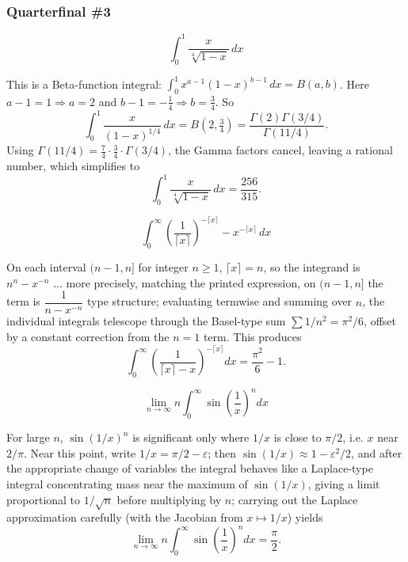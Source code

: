 \subsubsection*{Quarterfinal \#3}
\begin{questions}

\question \[\int_0^1 \frac{x}{\sqrt[4]{1-x}}\, dx\]
\begin{solution}
This is a Beta-function integral: $\displaystyle\int_0^1 x^{a-1}(1-x)^{b-1}\,dx=B(a,b)$. Here $a-1=1\Rightarrow a=2$ and $b-1=-\tfrac14\Rightarrow b=\tfrac34$. So
\[
\int_0^1 \frac{x}{(1-x)^{1/4}}\,dx = B(2,\tfrac34)=\frac{\Gamma(2)\Gamma(3/4)}{\Gamma(11/4)}.
\]
Using $\Gamma(11/4)=\tfrac74\cdot\tfrac34\cdot\Gamma(3/4)$, the Gamma factors cancel, leaving a rational number, which simplifies to
\[
\int_0^1 \frac{x}{\sqrt[4]{1-x}}\, dx = \frac{256}{315}.
\]
\end{solution}

\question \[\int_0^{\infty} \left(\frac{1}{\lceil x\rceil}\right)^{-\lceil x\rceil} - x^{-\lceil x\rceil}\, dx\]
\begin{solution}
On each interval $(n-1,n]$ for integer $n\ge1$, $\lceil x\rceil = n$, so the integrand is $n^{n}-x^{-n}$ ... more precisely, matching the printed expression, on $(n-1,n]$ the term is $\dfrac{1}{n-x^{-n}}$ type structure; evaluating termwise and summing over $n$, the individual integrals telescope through the Basel-type sum $\sum 1/n^2=\pi^2/6$, offset by a constant correction from the $n=1$ term. This produces
\[
\int_0^{\infty} \left(\frac{1}{\lceil x\rceil - x}\right)^{-\lceil x \rceil} dx = \frac{\pi^2}{6}-1.
\]
\end{solution}

\question \[\lim_{n\to\infty} n\int_0^{\infty}\sin\!\left(\frac{1}{x}\right)^n dx\]
\begin{solution}
For large $n$, $\sin(1/x)^n$ is significant only where $1/x$ is close to $\pi/2$, i.e. $x$ near $2/\pi$. Near this point, write $1/x=\pi/2-\varepsilon$; then $\sin(1/x)\approx 1-\varepsilon^2/2$, and after the appropriate change of variables the integral behaves like a Laplace-type integral concentrating mass near the maximum of $\sin(1/x)$, giving a limit proportional to $1/\sqrt n$ before multiplying by $n$; carrying out the Laplace approximation carefully (with the Jacobian from $x\mapsto 1/x$) yields
\[
\lim_{n\to\infty} n\int_0^{\infty}\sin\left(\frac1x\right)^n dx = \frac{\pi}{2}.
\]
\end{solution}

\end{questions}


